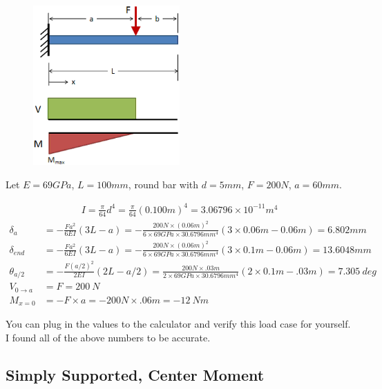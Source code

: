 \documentclass[10pt,letterpaper]{article}
\begin{document}
	\begin{figure}[H]
		\includegraphics[width=0.5\textwidth]{beam_case1_schematic.png}
	\end{figure}

	Let $E = 69 GPa$, $L = 100 mm$, round bar with $d = 5 mm$, $F = 200 N$, $a = 60mm$.

	\begin{align}
		I = \frac{\pi}{64} d^4 = \frac{\pi}{64} (0.100 m)^4 = 3.06796 \times 10^{-11} m^4
	\end{align}
	\begin{align}
		\delta_{a} &= - \frac{F a^2}{6 E I} (3 L - a) = - \frac{200 N \times (0.06 m)^2}{6 \times 69 GPa \times 30.6796 mm^4} (3 \times 0.06 m - 0.06 m) = 6.802 mm\\
		\delta_{end} &= - \frac{F a^2}{6 E I} (3 L - a) = - \frac{200 N \times (0.06 m)^2}{6 \times 69 GPa \times 30.6796 mm^4} (3 \times 0.1 m - 0.06 m) = 13.6048 mm\\
		\theta_{a/2} &= - \frac{F (a/2)^2}{2 E I} (2 L - a/2) = \frac{200 N \times .03 m}{2 \times 69 GPa \times 30.6796 mm^4} (2 \times 0.1m - .03m) = 7.305 \ deg\\
		V_{0 \rightarrow a} &= F = 200 \ N \\
		M_{x=0} &= -F \times a = - 200 N \times .06 m = - 12\ Nm
	\end{align}

	You can plug in the values to the calculator and verify this load case for yourself. I found all of the above numbers to be accurate.

	\newpage
	\subsection{Simply Supported, Center Moment}
\end{document}

